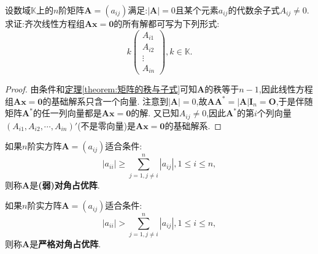 \documentclass[../../main.tex]{subfiles}
\begin{document}
\begin{proposition}\label{proposition:奇异系数矩阵Ax=0的解空间}
设数域\(\mathbb{K}\)上的\(n\)阶矩阵\(\boldsymbol{A}=(a_{ij})\)满足:\(|\boldsymbol{A}| = 0\)且某个元素\(a_{ij}\)的代数余子式\(A_{ij}\neq0\). 求证:齐次线性方程组\(\boldsymbol{A}\boldsymbol{x}=\boldsymbol{0}\)的所有解都可写为下列形式:
\[
k\begin{pmatrix}
A_{i1}\\
A_{i2}\\
\vdots\\
A_{in}
\end{pmatrix},k\in\mathbb{K}.
\]
\end{proposition}
\begin{proof}
由条件和\hyperref[theorem:矩阵的秩与子式]{定理\ref{theorem:矩阵的秩与子式}}可知\(\boldsymbol{A}\)的秩等于\(n - 1\),因此线性方程组\(\boldsymbol{A}\boldsymbol{x}=\boldsymbol{0}\)的基础解系只含一个向量. 注意到\(|\boldsymbol{A}| = 0\),故\(\boldsymbol{A}\boldsymbol{A}^*=|\boldsymbol{A}|\boldsymbol{I}_n=\boldsymbol{O}\),于是伴随矩阵\(\boldsymbol{A}^*\)的任一列向量都是\(\boldsymbol{A}\boldsymbol{x}=\boldsymbol{0}\)的解. 又已知\(A_{ij}\neq0\),因此\(\boldsymbol{A}^*\)的第\(i\)个列向量\((A_{i1},A_{i2},\cdots,A_{in})'\)(不是零向量)是\(\boldsymbol{A}\boldsymbol{x}=\boldsymbol{0}\)的基础解系.   
\end{proof}

\begin{definition}[对角占优阵]\label{definition:对角占优阵}
如果\(n\)阶实方阵\(\boldsymbol{A}=(a_{ij})\)适合条件:
\[
|a_{ii}|\geqslant \sum_{j = 1,j\neq i}^{n}|a_{ij}|,1\leqslant  i\leqslant  n,
\]
则称\(\boldsymbol{A}\)是\textbf{(弱)对角占优阵}.

如果\(n\)阶实方阵\(\boldsymbol{A}=(a_{ij})\)适合条件:
\[
|a_{ii}|>\sum_{j = 1,j\neq i}^{n}|a_{ij}|,1\leqslant  i\leqslant  n,
\]
则称\(\boldsymbol{A}\)是\textbf{严格对角占优阵}.
\end{definition}
\end{document}
